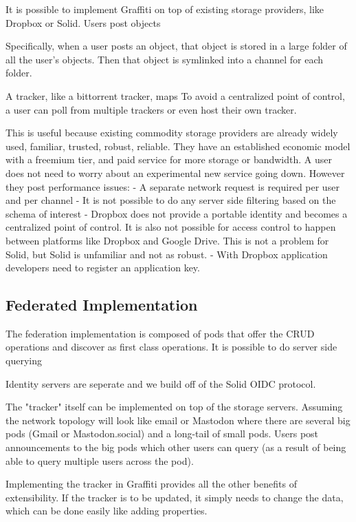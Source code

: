 It is possible to implement Graffiti on top of existing storage providers,
like Dropbox or Solid. Users post objects

Specifically, when a user posts an object, that object is stored in
a large folder of all the user's objects. Then that object is symlinked into
a channel for each folder.

A tracker, like a bittorrent tracker, maps
To avoid a centralized point of control, a user can poll from multiple trackers or
even host their own tracker.

This is useful because existing commodity storage providers are
already widely used, familiar, trusted, robust, reliable.
They have an established economic model with a freemium tier, and paid
service for more storage or bandwidth.
A user does not need to worry about an experimental new service going down.
However they post performance issues:
- A separate network request is required per user and per channel
- It is not possible to do any server side filtering based on the schema of interest
- Dropbox does not provide a portable identity and becomes a centralized point of control.
It is also not possible for access control to happen between platforms like Dropbox and Google Drive.
This is not a problem for Solid, but Solid is unfamiliar and not as robust.
- With Dropbox application developers need to register an application key.

\subsection{Federated Implementation}

The federation implementation is composed of pods that offer
the CRUD operations and discover as first class operations.
It is possible to do server side querying

Identity servers are seperate and we build off of the Solid OIDC protocol.

The "tracker" itself can be implemented on top of the storage servers.
Assuming the network topology will look like email or Mastodon where there are several
big pods (Gmail or Mastodon.social) and a long-tail of small pods.
Users post announcements to the big pods which other users can query
(as a result of being able to query multiple users across the pod).

Implementing the tracker in Graffiti provides all the other benefits of extensibility.
If the tracker is to be updated, it simply needs to change the data,
which can be done easily like adding properties.

